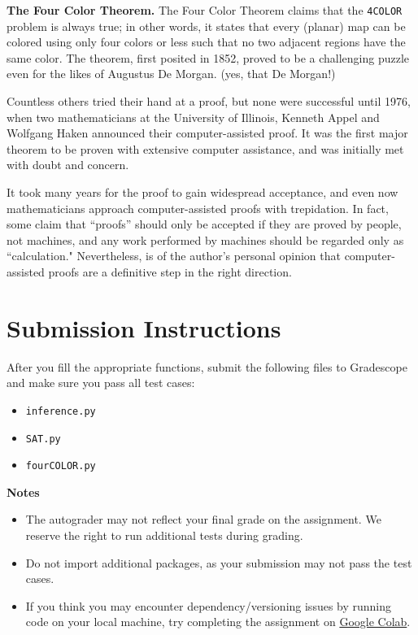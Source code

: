 \documentclass{article}
\begin{document}
    \begin{tcolorbox}[colback=green!10, phantom=\phantomsection\hypertarget{fct}]

        \textbf{The Four Color Theorem.}
        The Four Color Theorem claims that the \lstinline{4COLOR} problem is always true; in other words, it states that every (planar) map can be colored using only four colors or less such that no two adjacent regions have the same color. The theorem, first posited in 1852, proved to be a challenging puzzle even for the likes of Augustus De Morgan. (yes, that De Morgan!)

        \vspace{3mm}
        Countless others tried their hand at a proof, but none were successful until 1976, when two mathematicians at the University of Illinois, Kenneth Appel and Wolfgang Haken announced their computer-assisted proof.  It was the first major theorem to be proven with extensive computer assistance, and was initially met with doubt and concern.

        \vspace{3mm}
        It took many years for the proof to gain widespread acceptance, and even now mathematicians approach computer-assisted proofs with trepidation. In fact, some claim that ``proofs” should only be accepted if they are proved by people, not machines, and any work performed by machines should be regarded only as ``calculation." Nevertheless, is of the author's personal opinion that computer-assisted proofs are a definitive step in the right direction.
    \end{tcolorbox}

\section{Submission Instructions}
    After you fill the appropriate functions, submit the following files to Gradescope and make sure you pass all test cases:
    \begin{itemize}
        \item \lstinline{inference.py}
        \item \lstinline{SAT.py}
        \item \lstinline{fourCOLOR.py}
    \end{itemize}

    \vspace{3mm}
    \textbf{Notes}

    \begin{itemize}
        \item The autograder may not reflect your final grade on the assignment. We reserve the right to run additional tests during grading.
        \item Do not import additional packages, as your submission may not pass the test cases.
        \item If you think you may encounter dependency/versioning issues by running code on your local machine, try completing the assignment on \href{https://colab.research.google.com/}{Google Colab}.
    \end{itemize}
\end{document}
